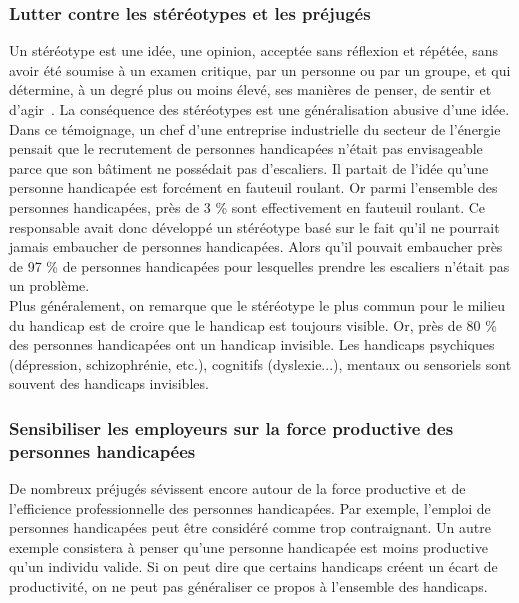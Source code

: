 \subsubsection{Lutter contre les stéréotypes et les préjugés}

Un stéréotype est une idée, une opinion, acceptée sans réflexion et répétée, sans avoir été soumise à un examen critique, par un personne ou par un groupe, et qui détermine, à un degré plus ou moins élevé, ses manières de penser, de sentir et d'agir~\cite{handicapEntrepriseContraintes}.
La conséquence des stéréotypes est une généralisation abusive d'une idée. 
Dans ce témoignage, un chef d'une entreprise industrielle du secteur de l'énergie pensait que le recrutement de personnes handicapées n'était pas envisageable parce que son bâtiment ne possédait pas d'escaliers. Il partait de l'idée qu'une personne handicapée est forcément en fauteuil roulant. Or parmi l'ensemble des personnes handicapées, près de 3 \% sont effectivement en fauteuil roulant. Ce responsable avait donc développé un stéréotype basé sur le fait qu'il ne pourrait jamais embaucher de personnes handicapées. Alors qu'il pouvait embaucher près de 97 \% de personnes handicapées pour lesquelles prendre les escaliers n'était pas un problème.\\

Plus généralement, on remarque que le stéréotype le plus commun pour le milieu du handicap est de croire que le handicap est toujours visible. Or, près de 80 \% des personnes handicapées ont un handicap invisible. Les handicaps psychiques (dépression, schizophrénie, etc.), cognitifs (dyslexie...), mentaux ou sensoriels sont souvent des handicaps invisibles.


\subsubsection{Sensibiliser les employeurs sur la force productive des personnes handicapées}

De nombreux préjugés sévissent encore autour de la force productive et de l'efficience professionnelle des personnes handicapées. Par exemple, l'emploi de personnes handicapées peut \^etre considéré comme trop contraignant. Un autre exemple consistera à penser qu'une personne handicapée est moins productive qu'un individu valide. Si on peut dire que certains handicaps créent un écart de productivité, on ne peut pas généraliser ce propos à l'ensemble des handicaps. \\

